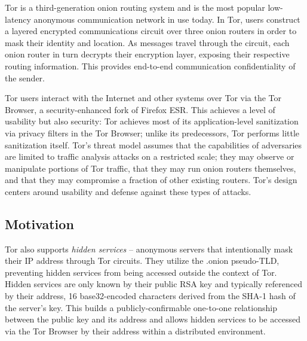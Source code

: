 \documentclass[conference]{IEEEtran}
\begin{document}
Tor\cite{dingledine2004tor} is a third-generation onion routing system and is the most popular low-latency anonymous communication network in use today. In Tor, users construct a layered encrypted communications circuit over three onion routers in order to mask their identity and location. As messages travel through the circuit, each onion router in turn decrypts their encryption layer, exposing their respective routing information. This provides end-to-end communication confidentiality of the sender.

Tor users interact with the Internet and other systems over Tor via the Tor Browser, a security-enhanced fork of Firefox ESR. This achieves a level of usability but also security: Tor achieves most of its application-level sanitization via privacy filters in the Tor Browser; unlike its predecessors, Tor performs little sanitization itself. Tor's threat model assumes that the capabilities of adversaries are limited to traffic analysis attacks on a restricted scale; they may observe or manipulate portions of Tor traffic, that they may run onion routers themselves, and that they may compromise a fraction of other existing routers. Tor's design centers around usability and defense against these types of attacks.

\subsection{Motivation}

Tor also supports \emph{hidden services} -- anonymous servers that intentionally mask their IP address through Tor circuits. They utilize the .onion pseudo-TLD, preventing hidden services from being accessed outside the context of Tor. Hidden services are only known by their public RSA key and typically referenced by their address, 16 base32-encoded characters derived from the SHA-1 hash of the server's key. This builds a publicly-confirmable one-to-one relationship between the public key and its address and allows hidden services to be accessed via the Tor Browser by their address within a distributed environment.
\end{document}
